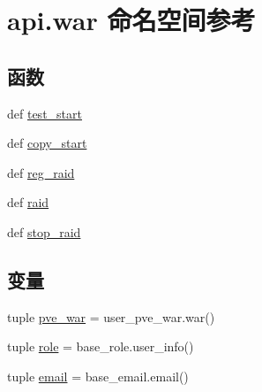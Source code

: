 \hypertarget{namespaceapi_1_1war}{\section{api.\-war 命名空间参考}
\label{namespaceapi_1_1war}
}
\subsection*{函数}
\begin{DoxyCompactItemize}
\item 
def \hyperlink{namespaceapi_1_1war_a094b5ead8e193f4dea39c432166db503}{test\-\_\-start}
\item 
def \hyperlink{namespaceapi_1_1war_a28978e73db622577422216b171b74d00}{copy\-\_\-start}
\item 
def \hyperlink{namespaceapi_1_1war_a0f4f2c80a1fec70945ae255d5b86d599}{reg\-\_\-raid}
\item 
def \hyperlink{namespaceapi_1_1war_a6860fc981b6a111fa763fcb36d9a6803}{raid}
\item 
def \hyperlink{namespaceapi_1_1war_ae19b62f2cb0f6f24ead024a236c89def}{stop\-\_\-raid}
\end{DoxyCompactItemize}
\subsection*{变量}
\begin{DoxyCompactItemize}
\item 
tuple \hyperlink{namespaceapi_1_1war_acf4f0adf976d198c5eac411d9d5bbbe5}{pve\-\_\-war} = user\-\_\-pve\-\_\-war.\-war()
\item 
tuple \hyperlink{namespaceapi_1_1war_ae54fd1efdd0587ecbd6a788b662d497a}{role} = base\-\_\-role.\-user\-\_\-info()
\item 
tuple \hyperlink{namespaceapi_1_1war_af9485067edcb8ab2a1319223851a5535}{email} = base\-\_\-email.\-email()
\end{DoxyCompactItemize}


